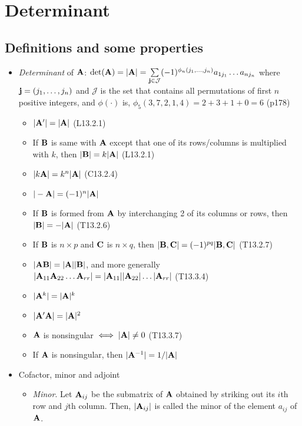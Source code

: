 \documentclass[a4paper, oneside]{book}
\begin{document}
\chapter{Determinant}


\section{Definitions and some properties}

\begin{itemize}
\item \textit{Determinant} of $\mathbf{A}$: $\det(\mathbf{A})=|\mathbf{A}| = \sum\limits_{\mathbf{j}\in \mathcal{J}} (-1)^{\phi_n(j_1,\hdots,j_n)} a_{1j_1}\hdots a_{nj_n}$ where $\mathbf{j}=(j_1,\hdots,j_n)$ and $\mathcal{J}$ is the set that contains all permutations of first $n$ positive integers, and $\phi(\cdot)$ is, \eg $\phi_5(3,7,2,1,4) = 2+3+1+0=6$ (p178)
	\begin{itemize}
	\item $|\mathbf{A}'|=|\mathbf{A}|$ (L13.2.1)
	\item If $\mathbf{B}$ is same with $\mathbf{A}$ except that one of its rows/columns is multiplied with $k$, then $|\mathbf{B}|=k|\mathbf{A}|$ (L13.2.1)
	\item $|k\mathbf{A}|=k^n |\mathbf{A}|$ (C13.2.4)
	\item $|-\mathbf{A}|=(-1)^n |\mathbf{A}|$
	\item If $\mathbf{B}$ is formed from $\mathbf{A}$ by interchanging 2 of its columns or rows, then $|\mathbf{B}|=-|\mathbf{A}|$ (T13.2.6)
	\item If $\mathbf{B}$ is $n\times p$ and $\mathbf{C}$ is $n\times q$, then $|\mathbf{B,C}|=(-1)^{pq}|\mathbf{B,C}|$ (T13.2.7)
	\item $\mathbf{|AB|=|A||B|}$, and more generally $|\mathbf{A}_{11}\mathbf{A}_{22}\hdots \mathbf{A}_{rr}|=|\mathbf{A}_{11}||\mathbf{A}_{22}|\hdots |\mathbf{A}_{rr}|$ (T13.3.4)
	\item $|\mathbf{A}^k|=|\mathbf{A}|^k$
	\item $|\mathbf{A'A}|=|\mathbf{A}|^2$
	\item $\mathbf{A}$ is nonsingular $\iff |\mathbf{A}|\neq 0$ (T13.3.7)
	\item If $\mathbf{A}$ is nonsingular, then $|\mathbf{A}^{-1}|=1/|\mathbf{A}|$
\end{itemize}
\item Cofactor, minor and adjoint
	\begin{itemize}
	\item \textit{Minor}. Let $\mathbf{A}_{ij}$ be the submatrix of $\mathbf{A}$ obtained by striking out its $i$th row and $j$th column. Then, $|\mathbf{A}_{ij}|$ is called the minor of the element $a_{ij}$ of $\mathbf{A}$.

\end{itemize}
\end{itemize}
\end{document}
